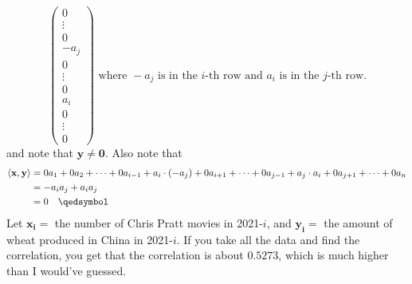 \documentclass[12pt]{article}
\newcommand{\ip}[2]{\langle \mathbf{#1}, \mathbf{#2} \rangle}
\begin{document}
\begin{enumerate}[leftmargin=\labelsep]
$$\begin{pmatrix}
		0 \\
		\vdots \\
		0 \\
		-a_j \\
		0 \\
		\vdots \\
		0 \\
		a_i \\
		0 \\
		\vdots \\
		0
		\end{pmatrix} \text{ where } -a_j \text{ is in the $i$-th row and } a_i \text{ is in the $j$-th row.}$$ and note that $\mathbf{y} \neq \mathbf{0}$. Also note  that 
		\begin{align*}\ip{x}{y} &= 0a_1 + 0a_2 + \cdots + 0a_{i-1} + a_i \cdot (-a_j) + 0a_{i+1} + \cdots + 0a_{j-1} + a_j \cdot a_i + 0a_{j+1} + \cdots + 0a_n \\
			&= -a_i a_j + a_i a_j \\
			&= 0 \quad \qedsymbol
		\end{align*}
		Let $\mathbf{x_i}=$ the number of Chris Pratt movies in 2021-$i$, and $\mathbf{y_i}=$ the amount of wheat produced in China in 2021-$i$. If you take all the data and find the correlation, you get that the correlation is about $0.5273$, which is much higher than I would've guessed. 
		

\end{enumerate}
\end{document}
